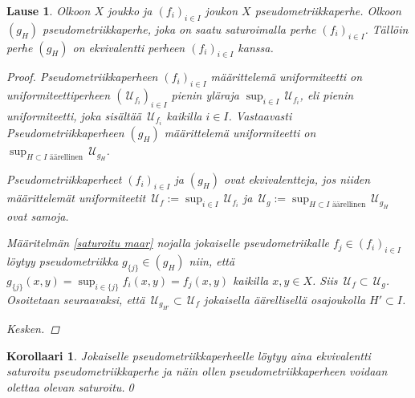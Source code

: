 \documentclass[12pt,a4paper,leqno]{report}
\newcommand{\U}{\,\mathcal{U}}
\theoremstyle{plain}
\newtheorem{lause}[equation]{Lause}
\newtheorem{kor}[equation]{Korollaari}
\theoremstyle{definition}
\theoremstyle{remark}
\begin{document}
\begin{lause}
Olkoon $X$ joukko ja $(f_i)_{i\in I} $ joukon $X$ pseudometriikkaperhe. 
Olkoon $(g_H) $ pseudometriikkaperhe, 
joka on saatu saturoimalla perhe $(f_i)_{i\in I} $. 
Tällöin perhe $(g_H) $ on ekvivalentti 
perheen $(f_i)_{i\in I}$ kanssa.
\begin{proof}
Pseudometriikkaperheen $(f_i)_{i\in I}$ määrittelemä uniformiteetti on 
uniformiteettiperheen $(\U_{f_i})_{i\in I}$ pienin yläraja $\sup_{i\in I}\U_{f_i}$, 
eli pienin uniformiteetti, 
joka sisältää $\U_{f_i}$ kaikilla $i\in I$. 
Vastaavasti Pseudometriikkaperheen $(g_H)$ määrittelemä 
uniformiteetti on $\sup_{H\subset I\text{ äärellinen}}\U_{g_H}$. 

Pseudometriikkaperheet $(f_i)_{i\in I}$ ja $(g_H)$ 
ovat ekvivalentteja, 
jos niiden määrittelemät uniformiteetit 
$\U_f:=\sup_{i\in I}\U_{f_i}$ ja 
$\U_g:=\sup_{H\subset I\text{ äärellinen}}\U_{g_H}$ 
ovat samoja. 

Määritelmän \ref{saturoitu maar} nojalla 
jokaiselle pseudometriikalle $f_j\in(f_i)_{i\in I}$ löytyy 
pseudometriikka $g_{\{j\}}\in (g_H)$ niin, 
että $g_{\{j\}}(x,y)=\sup_{i\in\{j\}}f_i(x,y)=f_j(x,y)$ 
kaikilla $x,y\in X$. 
Siis $\U_f\subset\U_g$. 
%
%
Osoitetaan seuraavaksi, että 
$\U_{g_{H'}}\subset\U_{f}$ 
jokaisella äärellisellä osajoukolla $H'\subset I$. 



Kesken.
\end{proof}
\end{lause}
\begin{kor}\label{saturoitu oletus}
Jokaiselle pseudometriikkaperheelle löytyy aina ekvivalentti saturoitu pseudometriikkaperhe 
ja näin ollen pseudometriikkaperheen voidaan olettaa olevan saturoitu.\qed
\end{kor}
\end{document}
